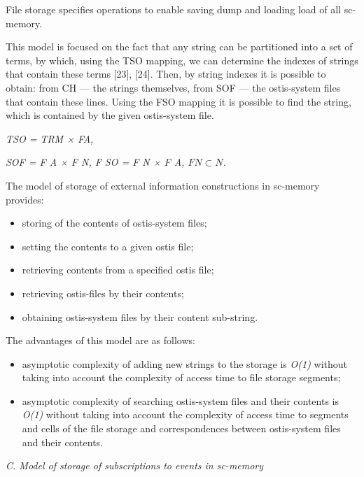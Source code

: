 \documentclass[10pt, a4paper]{article}
\begin{document}
\begin{multicols}{2}
File storage specifies operations to enable saving dump and loading load of all sc-memory.

This model is focused on the fact that any string can be partitioned into a set of terms, by which, using the TSO mapping, we can determine the indexes of strings that contain these terms [23], [24]. Then, by string indexes it is possible to obtain: from CH — the strings themselves, from SOF — the ostis-system files that contain these lines. Using the FSO mapping it is possible to find the string, which is contained by the given ostis-system file.
\begin{center}
\textit{TSO = TRM × FA,}

\textit{SOF = F A × F N, F SO = F N × F A, $F N \subset N$.}
\end{center}

The model of storage of external information constructions in sc-memory provides:
\begin{itemize}
\setlength{\parskip}{0pt}
\setlength{\itemsep}{0pt}
    \item storing of the contents of ostis-system files;
    \item setting the contents to a given ostis file;
    \item retrieving contents from a specified ostis file;
    \item retrieving ostis-files by their contents;
    \item obtaining ostis-system files by their content sub-string.
\end{itemize}
The advantages of this model are as follows:
\begin{itemize}
\setlength{\parskip}{0pt}
\setlength{\itemsep}{0pt}
    \item asymptotic complexity of adding new strings to the storage is \textit{O(1)} without taking into account the complexity of access time to file storage segments;
    \item asymptotic complexity of searching ostis-system files and their contents is \textit{O(1)} without taking into account the complexity of access time to segments and cells of the file storage and correspondences
between ostis-system files and their contents.
\end{itemize}
\textit{C. Model of storage of subscriptions to events in sc-memory}


\end{multicols}
\end{document}
